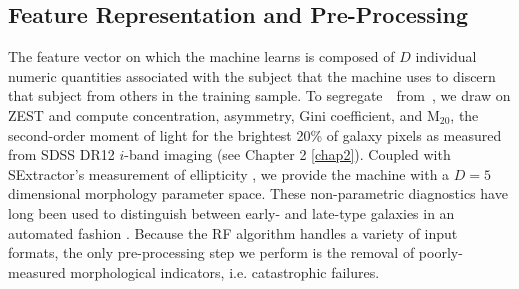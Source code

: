 \subsection{Feature Representation and Pre-Processing}
The feature vector on which the machine learns is composed of $D$ individual 
numeric quantities associated with the subject that the machine uses to discern 
that subject from others in the training sample. 
To segregate~\feat~from~\notfeat, we draw on ZEST \citep{Scarlata2007} and compute
 concentration, asymmetry, Gini coefficient, and M$_{20}$, 
the second-order moment of light for the brightest 20\% of galaxy pixels as
measured from SDSS DR12 $i$-band imaging (see Chapter 2 \ref{chap2}). 
Coupled with SExtractor's measurement of ellipticity \citep{sextractor}, 
we provide the machine with a $D=5$ dimensional morphology parameter space.
These non-parametric diagnostics have long been used to distinguish between early- and late-type galaxies 
in an automated fashion \cite[e.g.,][]{Abraham1996, Bershady2000, Conselice2000, Abraham2003, Conselice2003, Lotz2004, Snyder2015}.
Because the RF algorithm handles a variety of input formats, the only pre-processing 
step we perform is the removal of poorly-measured morphological indicators, i.e. catastrophic failures.



